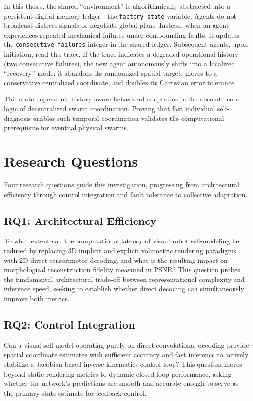 \documentclass[12pt,a4paper,oneside]{report}
\begin{document}
In this thesis, the shared ``environment'' is algorithmically abstracted into a persistent digital memory ledger---the \texttt{factory\_state} variable. Agents do not broadcast distress signals or negotiate global plans. Instead, when an agent experiences repeated mechanical failures under compounding faults, it updates the \texttt{consecutive\_failures} integer in the shared ledger. Subsequent agents, upon initiation, read this trace. If the trace indicates a degraded operational history (two consecutive failures), the new agent autonomously shifts into a localized ``recovery'' mode: it abandons its randomized spatial target, moves to a conservative centralized coordinate, and doubles its Cartesian error tolerance.

This state-dependent, history-aware behavioral adaptation is the absolute core logic of decentralized swarm coordination. Proving that fast individual self-diagnosis enables such temporal coordination validates the computational prerequisite for eventual physical swarms.
\section{Research Questions}
\label{sec:research_questions}

Four research questions guide this investigation, progressing from architectural efficiency through control integration and fault tolerance to collective adaptation.
\subsection{RQ1: Architectural Efficiency}
\label{subsec:RQ1}

To what extent can the computational latency of visual robot self-modeling be reduced by replacing 3D implicit and explicit volumetric rendering paradigms with 2D direct sensorimotor decoding, and what is the resulting impact on morphological reconstruction fidelity measured in PSNR? This question probes the fundamental architectural trade-off between representational complexity and inference speed, seeking to establish whether direct decoding can simultaneously improve both metrics.
\subsection{RQ2: Control Integration}
\label{subsec:RQ2}

Can a visual self-model operating purely on direct convolutional decoding provide spatial coordinate estimates with sufficient accuracy and fast inference to actively stabilize a Jacobian-based inverse kinematics control loop? This question moves beyond static rendering metrics to dynamic closed-loop performance, asking whether the network's predictions are smooth and accurate enough to serve as the primary state estimate for feedback control.
\end{document}
